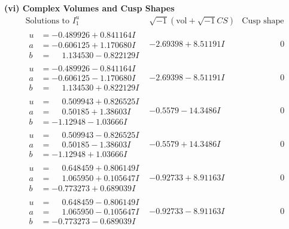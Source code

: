 \documentclass[1p]{elsarticle_modified}
\theoremstyle{definition}
\newcommand{\I}{\sqrt{-1}}
\begin{document}
\newpage\flushleft \textbf{(vi) Complex Volumes and Cusp Shapes}
$$\begin{array}{c|c|c}  
\text{Solutions to }I^u_{1}& \I (\text{vol} + \sqrt{-1}CS) & \text{Cusp shape}\\
 \hline 
\begin{aligned}
u &= -0.489926 + 0.841164 I \\
a &= -0.606125 + 1.170680 I \\
b &= \phantom{-}1.134530 - 0.822129 I\end{aligned}
 & -2.69398 + 8.51191 I & \phantom{-0.000000 } 0 \\ \hline\begin{aligned}
u &= -0.489926 - 0.841164 I \\
a &= -0.606125 - 1.170680 I \\
b &= \phantom{-}1.134530 + 0.822129 I\end{aligned}
 & -2.69398 - 8.51191 I & \phantom{-0.000000 } 0 \\ \hline\begin{aligned}
u &= \phantom{-}0.509943 + 0.826525 I \\
a &= \phantom{-}0.50185 + 1.38603 I \\
b &= -1.12948 - 1.03666 I\end{aligned}
 & -0.5579 - 14.3486 I & \phantom{-0.000000 } 0 \\ \hline\begin{aligned}
u &= \phantom{-}0.509943 - 0.826525 I \\
a &= \phantom{-}0.50185 - 1.38603 I \\
b &= -1.12948 + 1.03666 I\end{aligned}
 & -0.5579 + 14.3486 I & \phantom{-0.000000 } 0 \\ \hline\begin{aligned}
u &= \phantom{-}0.648459 + 0.806149 I \\
a &= \phantom{-}1.065950 + 0.105647 I \\
b &= -0.773273 + 0.689039 I\end{aligned}
 & -0.92733 + 8.91163 I & \phantom{-0.000000 } 0 \\ \hline\begin{aligned}
u &= \phantom{-}0.648459 - 0.806149 I \\
a &= \phantom{-}1.065950 - 0.105647 I \\
b &= -0.773273 - 0.689039 I\end{aligned}
 & -0.92733 - 8.91163 I & \phantom{-0.000000 } 0 \\ \hline\begin{aligned}

\end{aligned}
\end{array}$$
\end{document}

